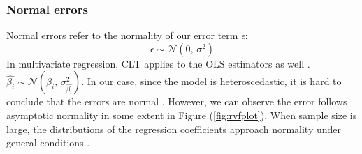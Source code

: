 \subsubsection{Normal errors}\label{appendix:normality}
Normal errors refer to the normality of our error term $\epsilon$:
\[
\epsilon \sim \mathcal{N}(0,\,\sigma^{2})
\]
In multivariate regression, \acs{CLT} applies to the \acs{OLS} estimators as well \cite{christopher_2006, stock_watson_2019}. \ie\,$\hat{\beta_{i}} \sim \mathcal{N}(\beta_{i},\,\sigma^{2}_{\hat{\beta_{i}}})$. In our case, since the model is heteroscedastic, it is hard to conclude that the errors are normal \cite{wooldridge_2020}. However, we can observe the error follows asymptotic normality in some extent in Figure (\ref{fig:rvfplot}). When sample size is large, the distributions of the regression coefficients approach normality under general conditions \cite{kuter_nachtsheim_neter_li_2005}.